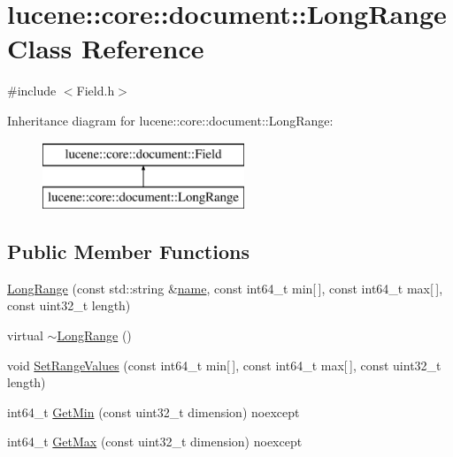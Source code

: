 \hypertarget{classlucene_1_1core_1_1document_1_1LongRange}{}\section{lucene\+:\+:core\+:\+:document\+:\+:Long\+Range Class Reference}
\label{classlucene_1_1core_1_1document_1_1LongRange}


{\ttfamily \#include $<$Field.\+h$>$}

Inheritance diagram for lucene\+:\+:core\+:\+:document\+:\+:Long\+Range\+:\begin{figure}[H]
\begin{center}
\leavevmode
\includegraphics[height=2.000000cm]{classlucene_1_1core_1_1document_1_1LongRange}
\end{center}
\end{figure}
\subsection*{Public Member Functions}
\begin{DoxyCompactItemize}
\item 
\mbox{\hyperlink{classlucene_1_1core_1_1document_1_1LongRange_a7f20f8b15104f6ea7e3cab36310ce777}{Long\+Range}} (const std\+::string \&\mbox{\hyperlink{classlucene_1_1core_1_1document_1_1Field_a52f673f3b3abb14b180f5159f4726537}{name}}, const int64\+\_\+t min\mbox{[}$\,$\mbox{]}, const int64\+\_\+t max\mbox{[}$\,$\mbox{]}, const uint32\+\_\+t length)
\item 
virtual \mbox{\hyperlink{classlucene_1_1core_1_1document_1_1LongRange_a43d92b6373148b460ad9266023ab57ec}{$\sim$\+Long\+Range}} ()
\item 
void \mbox{\hyperlink{classlucene_1_1core_1_1document_1_1LongRange_a2ddad3123f8537aa9958f0e61052aa2a}{Set\+Range\+Values}} (const int64\+\_\+t min\mbox{[}$\,$\mbox{]}, const int64\+\_\+t max\mbox{[}$\,$\mbox{]}, const uint32\+\_\+t length)
\item 
int64\+\_\+t \mbox{\hyperlink{classlucene_1_1core_1_1document_1_1LongRange_afaeef89fe3e5d4b30f16ba38d8479f4d}{Get\+Min}} (const uint32\+\_\+t dimension) noexcept
\item 
int64\+\_\+t \mbox{\hyperlink{classlucene_1_1core_1_1document_1_1LongRange_a2daa2b07e3b18836fc45e6210890aaf9}{Get\+Max}} (const uint32\+\_\+t dimension) noexcept
\end{DoxyCompactItemize}
